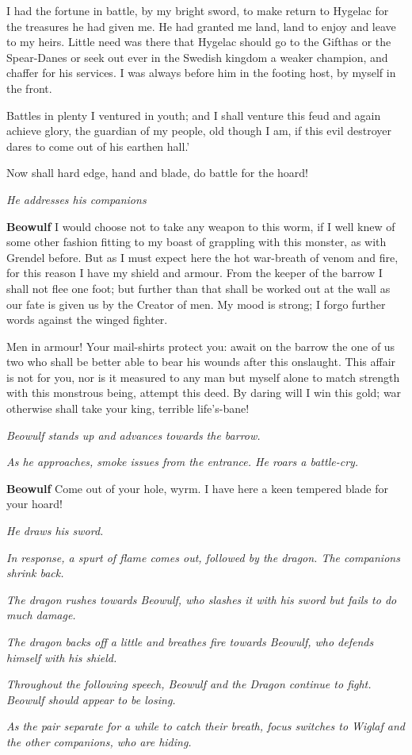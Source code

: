 \documentclass[a4paper]{article}
\begin{document}
{I had the fortune in battle, by my bright sword,
to make return to Hygelac for the treasures he had given me.
He had granted me land, land to enjoy
and leave to my heirs. Little need was there
that Hygelac should go to the Gifthas or the Spear-Danes
or seek out ever in the Swedish kingdom
a weaker champion, and chaffer for his services.
I was always before him in the footing host,
by myself in the front.

Battles in plenty
I ventured in youth; and I shall venture this feud
and again achieve glory, the guardian of my people,
old though I am, if this evil destroyer
dares to come out of his earthen hall.'

Now shall hard edge,
hand and blade, do battle for the hoard!

\centerline{\textit{He addresses his companions}}

\textbf{Beowulf} I would choose not to take
any weapon to this worm, if I well knew
of some other fashion fitting to my boast
of grappling with this monster, as with Grendel before.
But as I must expect here the hot war-breath
of venom and fire, for this reason I have
my shield and armour. From the keeper of the barrow
I shall not flee one foot; but further than that
shall be worked out at the wall as our fate is given us
by the Creator of men. My mood is strong;
I forgo further words against the winged fighter.

\newpage
Men in armour! Your mail-shirts protect you:
await on the barrow the one of us two
who shall be better able to bear his wounds
after this onslaught. This affair is not for you,
nor is it measured to any man but myself alone
to match strength with this monstrous being,
attempt this deed. By daring will I
win this gold; war otherwise
shall take your king, terrible life's-bane!

\centerline{\textit{Beowulf stands up and advances towards the barrow.}}
\centerline{\textit{As he approaches, smoke issues from the entrance. He roars a battle-cry.}}

\textbf{Beowulf} Come out of your hole, wyrm.
I have here a keen tempered blade for your hoard!

\centerline{\textit{He draws his sword.}}
\centerline{\textit{In response, a spurt of flame comes out, followed by the dragon. The companions shrink back.}}

\centerline{\textit{The dragon rushes towards Beowulf, who slashes it with his sword but fails to do much damage.}}
\centerline{\textit{The dragon backs off a little and breathes fire towards Beowulf, who defends himself with his shield.}}
\centerline{\textit{Throughout the following speech, Beowulf and the Dragon continue to fight. Beowulf should appear to be losing.}}
\centerline{\textit{As the pair separate for a while to catch their breath, focus switches to Wiglaf and the other companions, who are hiding.}}

}
\end{document}
